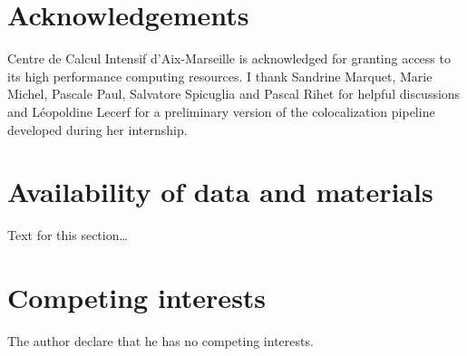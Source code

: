 
\begin{backmatter}

\section*{Acknowledgements}%
Centre de Calcul Intensif d'Aix-Marseille is acknowledged for granting access to its high performance computing resources.
%
I thank Sandrine Marquet, Marie Michel, Pascale Paul, Salvatore Spicuglia and Pascal Rihet for helpful discussions and Léopoldine Lecerf for a preliminary version of the colocalization pipeline developed during her internship.



\section*{Availability of data and materials}%
Text for this section\ldots


\section*{Competing interests}
The author declare that he has no competing interests.



\end{backmatter}
